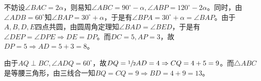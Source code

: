 不妨设$\angle BAC = 2\alpha$，则易知$\angle ABC = 90^\circ - \alpha, \angle ABP = 120^\circ - 2\alpha$。同时，由$\angle ADB = 60^\circ$知$\angle BAP = 30^\circ + \alpha$，于是有$\angle BPA = 30^\circ + \alpha = \angle BAP$。由于$A, B, D, E$四点共圆，由圆周角定理知$\angle BAD = \angle BED$，于是有$\angle DEP = \angle DPE \Rightarrow DE = DP$。而$DC = 5, AP = 3$，故$DP = 5 \Rightarrow AD = 5 + 3 = 8$。

由于$AQ \perp BC, \angle ADQ = 60^\circ$，故$DQ = \sfrac12AD = 4 \Rightarrow CQ = 4 + 5 = 9$。而$\triangle ABC$是等腰三角形，由三线合一知$BQ = CQ = 9 \Rightarrow BD = 4 + 9 = 13$。
